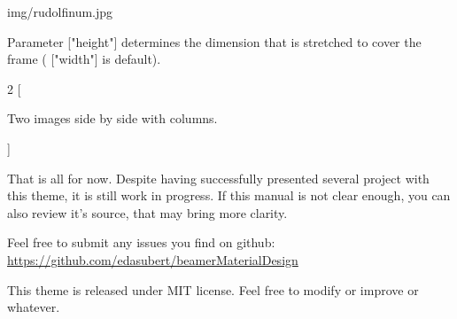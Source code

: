 \documentclass[9pt, aspectratio=169]{beamer}
\begin{document}
\begin{frameImg}[height]{img/rudolfinum.jpg}
\vspace*{60mm}
\begin{cardTiny}
Parameter {\color{primary} ["height"]} determines the dimension that is stretched to cover the frame ({\color{primary} ["width"]} is default).
\end{cardTiny}
\end{frameImg}

\begin{frame}
\begin{multicols}{2}
[
\begin{cardTiny}
Two images side by side with columns.
\end{cardTiny}
]
\centering
{}

\end{multicols}
\end{frame}

\begin{frame}
\begin{card}
That is all for now. Despite having successfully presented several project with this theme, it is still work in progress. If this manual is not clear enough, you can also review it's source, that may bring more clarity.
\end{card}
\begin{card}
Feel free to submit any issues you find on github: \\
{\footnotesize \url{https://github.com/edasubert/beamerMaterialDesign}}
\end{card}
\begin{card}
This theme is released under MIT license. Feel free to modify or improve or whatever. 
\end{card}
\end{frame}
\end{document}
